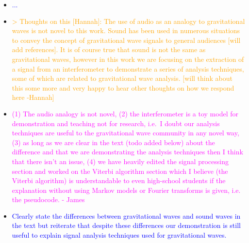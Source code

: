 \documentclass{article}
\newcommand{\todo}{\textcolor{blue}}
\newcommand{\han}{\textcolor{orange}}
\newcommand{\jam}{\textcolor{magenta}}
\begin{document}
\begin{itemize}
\item \todo{...}
\item \han{> Thoughts on this [Hannah]: The use of audio as an analogy to gravitational waves is not novel to this work. Sound has been used in numerous situations to convey the concept of gravitational wave signals to general audiences [will add references]. It is of course true that sound is not the same as gravitational waves, however in this work we are focusing on the extraction of a signal from an interferometer to demonstrate a series of analysis techniques, some of which are related to gravitational wave analysis. [will think about this some more and very happy to hear other thoughts on how we respond here -Hannah]}
\item \jam{(1) The audio analogy is not novel, (2) the interferometer is a toy model for demonstration and teaching not for research, i.e.\ I doubt our analysis techniques are useful to the gravitational wave community in any novel way, (3) as long as we are clear in the text (todo added below) about the difference and that we are demonstrating the analysis techniques then I think that there isn't an issue, (4) we have heavily edited the signal processing section and worked on the Viterbi algorithm section which I believe (the Viterbi algorithm) is understandable to even high-school students if the explanation without using Markov models or Fourier transforms is given, i.e. the pseudocode.  - James}
\item \todo{Clearly state the differences between gravitational waves and sound waves in the text but reiterate that despite these differences our demonstration is still useful to explain signal analysis techniques used for gravitational waves.}
\end{itemize}
\end{document}
